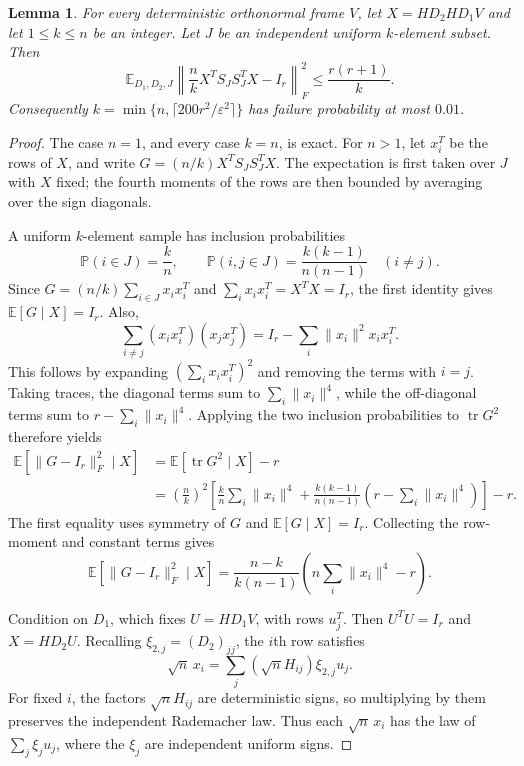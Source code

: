 \documentclass[11pt]{article}
\newtheorem{lemma}[theorem]{Lemma}
\theoremstyle{definition}
\theoremstyle{remark}
\theoremstyle{plain}
\newcommand{\E}{\mathbb E}
\newcommand{\Prob}{\mathbb P}
\DeclareMathOperator{\tr}{tr}
\begin{document}
\begin{lemma}\label{lem:small}
For every deterministic orthonormal frame \(V\), let \(X=HD_2HD_1V\)
and let $1\le k\le n$ be an integer. Let \(J\) be an independent
uniform \(k\)-element subset. Then
\begin{equation}\label{eq:small-rank-moment}
 \E_{D_1,D_2,J}\left\|\frac nkX^TS_JS_J^TX-I_r\right\|_F^2
                                      \le\frac{r(r+1)}k.
\end{equation}
Consequently \(k=\min\{n,\lceil200r^2/\varepsilon^2\rceil\}\)
has failure probability at most \(0.01\).
\end{lemma}
\begin{proof}
The case \(n=1\), and every case \(k=n\), is exact.
For \(n>1\), let \(x_i^T\) be the rows of \(X\), and write
\(G=(n/k)X^TS_JS_J^TX\). The expectation is first taken over $J$ with $X$
fixed; the fourth moments of the rows are then bounded by averaging over
the sign diagonals.

A uniform $k$-element sample has inclusion probabilities
\[
 \Prob(i\in J)=\frac kn,\qquad
 \Prob(i,j\in J)=\frac{k(k-1)}{n(n-1)}\quad(i\ne j).
\]
Since $G=(n/k)\sum_{i\in J}x_ix_i^T$ and
$\sum_i x_ix_i^T=X^TX=I_r$, the first identity gives
$\E[G\mid X]=I_r$. Also,
\[
 \sum_{i\ne j}(x_ix_i^T)(x_jx_j^T)
       =I_r-\sum_i\|x_i\|^2x_ix_i^T.
\]
This follows by expanding $(\sum_i x_ix_i^T)^2$ and removing the
terms with $i=j$. Taking traces, the diagonal terms sum to
$\sum_i\|x_i\|^4$, while the off-diagonal terms sum to
$r-\sum_i\|x_i\|^4$. Applying the two inclusion probabilities to
$\tr G^2$ therefore yields
\[
 \begin{aligned}
 \E[\|G-I_r\|_F^2\mid X]
   &=\E[\tr G^2\mid X]-r\\
   &=\left(\frac nk\right)^2
     \left[\frac kn\sum_i\|x_i\|^4
       +\frac{k(k-1)}{n(n-1)}
          \left(r-\sum_i\|x_i\|^4\right)\right]-r.
 \end{aligned}
\]
The first equality uses symmetry of $G$ and $\E[G\mid X]=I_r$.
Collecting the row-moment and constant terms gives
\begin{equation}\label{eq:conditional-sampling-moment}
 \E\!\left[\|G-I_r\|_F^2\mid X\right]
  =\frac{n-k}{k(n-1)}
                \left(n\sum_i\|x_i\|^4-r\right).
\end{equation}

Condition on $D_1$, which fixes $U=HD_1V$, with rows $u_j^T$.
Then $U^TU=I_r$ and $X=HD_2U$. Recalling
$\xi_{2,j}=(D_2)_{jj}$, the $i$th row satisfies
\[
 \sqrt n\,x_i=\sum_j(\sqrt n H_{ij})\xi_{2,j}u_j.
\]
For fixed $i$, the factors $\sqrt n H_{ij}$ are deterministic
signs, so multiplying by them preserves the independent Rademacher
law. Thus each $\sqrt n\,x_i$ has the law of $\sum_j\xi_j u_j$,
where the $\xi_j$ are independent uniform signs.


\end{proof}
\end{document}
